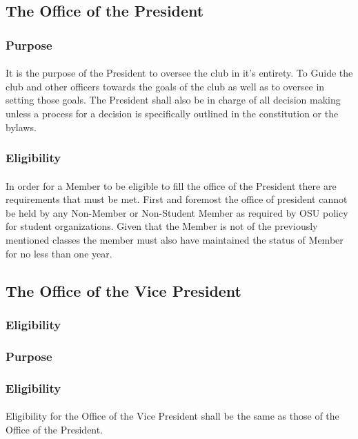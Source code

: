 \documentclass[12pt]{article}
\begin{document}
\subsection{The Office of the President}
\subsubsection{Purpose}
\paragraph{}
It is the purpose of the President to oversee the club in it's entirety. To Guide the club and other officers towards the goals of the club as well as to oversee in setting those goals. The President shall
also be in charge of all decision making unless a process for a decision is specifically outlined in the constitution or the bylaws.
\subsubsection{Eligibility}
\paragraph{}
In order for a Member to be eligible to fill the office of the President there are requirements that must be met. First and foremost the office of president cannot be held by any Non-Member or Non-Student Member as required by OSU policy for student organizations. Given that the Member is not of the previously mentioned classes the member must also have maintained the status of Member for no less than one year. 

\subsection{The Office of the Vice President}
\subsubsection{Eligibility}
\subsubsection{Purpose}
\subsubsection{Eligibility}
\paragraph{}
Eligibility for the Office of the Vice President shall be the same as those of the Office of the President.
\end{document}
